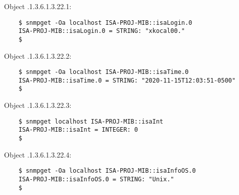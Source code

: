 \documentclass[10pt,a4paper]{article}
\begin{document}
	Object .1.3.6.1.3.22.1:
	\begin{lstlisting}
	$ snmpget -Oa localhost ISA-PROJ-MIB::isaLogin.0
	ISA-PROJ-MIB::isaLogin.0 = STRING: "xkocal00."
	$ 
	\end{lstlisting}

	Object .1.3.6.1.3.22.2:
	\begin{lstlisting}
	$ snmpget -Oa localhost ISA-PROJ-MIB::isaTime.0
	ISA-PROJ-MIB::isaTime.0 = STRING: "2020-11-15T12:03:51-0500"
	$ 
	\end{lstlisting}
		
	Object .1.3.6.1.3.22.3:
	\begin{lstlisting}
	$ snmpget localhost ISA-PROJ-MIB::isaInt
	ISA-PROJ-MIB::isaInt = INTEGER: 0
	$ 
	\end{lstlisting}

	Object .1.3.6.1.3.22.4:
	\begin{lstlisting}
	$ snmpget -Oa localhost ISA-PROJ-MIB::isaInfoOS.0
	ISA-PROJ-MIB::isaInfoOS.0 = STRING: "Unix."
	$ 
	\end{lstlisting}

	\printbibliography
\end{document}
